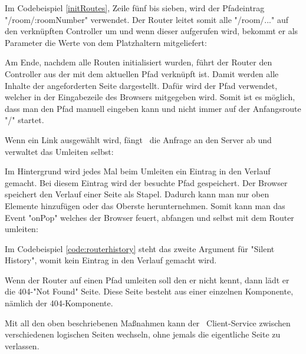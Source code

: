 Im Codebeispiel \ref{initRoutes}, Zeile fünf bis sieben, wird der Pfadeintrag "{\ttfamily /room/:roomNumber}" verwendet. Der Router leitet somit alle "{\ttfamily /room/...}" auf den verknüpften Controller um und wenn dieser aufgerufen wird, bekommt er als Parameter die Werte von dem Platzhaltern mitgeliefert:


Am Ende, nachdem alle Routen initialisiert wurden, führt der Router den Controller aus der mit dem aktuellen Pfad verknüpft ist. Damit werden alle  Inhalte der angeforderten Seite dargestellt. Dafür wird der Pfad verwendet, welcher in der Eingabezeile des Browsers mitgegeben wird. Somit ist es möglich, dass man den Pfad manuell eingeben kann und nicht immer auf der Anfangsroute "{\ttfamily /}" startet.

Wenn ein Link ausgewählt wird, fängt \ZELIA\ die Anfrage an den Server ab und verwaltet das Umleiten selbst:


Im  Hintergrund wird jedes Mal beim Umleiten ein Eintrag in den Verlauf gemacht. Bei diesem Eintrag wird der besuchte Pfad gespeichert. Der Browser speichert den Verlauf einer Seite als Stapel. Dadurch kann man nur oben Elemente hinzufügen oder das Oberste herunternehmen. Somit kann man das Event "onPop" welches der Browser feuert, abfangen und selbst mit dem Router umleiten:


Im Codebeispiel \ref{code:routerhistory} steht das zweite Argument für "Silent History", womit kein Eintrag in den Verlauf gemacht wird.

Wenn der Router auf einen Pfad umleiten soll den er nicht kennt, dann lädt er die 404-"Not Found" Seite. Diese Seite besteht aus einer einzelnen Komponente, nämlich der 404-Komponente.


Mit all den oben beschriebenen Maßnahmen kann der \ZELIA\ Client-Service zwischen verschiedenen logischen Seiten wechseln, ohne jemals die eigentliche Seite zu verlassen.
